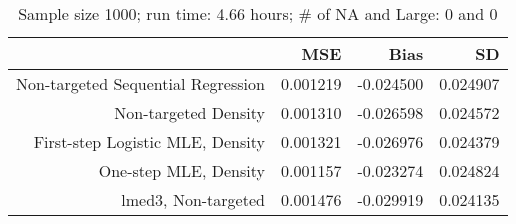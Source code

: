 \begin{table}[ht]
\centering
\caption{Sample size 1000; run time: 4.66 hours; # of NA and Large:  0 and 0} 
\begin{tabular}{rrrr}
  \hline
 & MSE & Bias & SD \\ 
  \hline
Non-targeted Sequential Regression & 0.001219 & -0.024500 & 0.024907 \\ 
  Non-targeted Density & 0.001310 & -0.026598 & 0.024572 \\ 
  First-step Logistic MLE, Density & 0.001321 & -0.026976 & 0.024379 \\ 
  One-step MLE, Density & 0.001157 & -0.023274 & 0.024824 \\ 
  lmed3, Non-targeted & 0.001476 & -0.029919 & 0.024135 \\ 
   \hline
\end{tabular}
\end{table}
